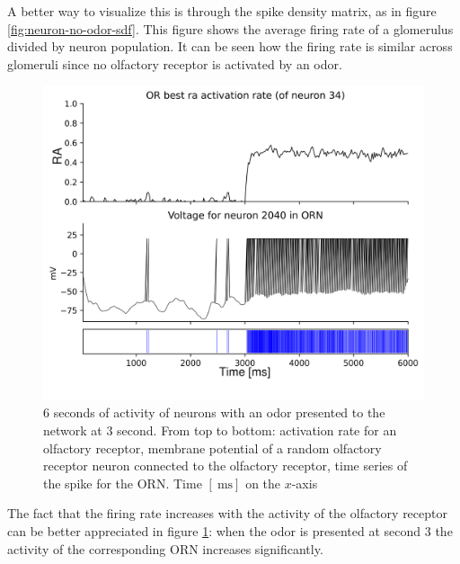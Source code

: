   A better way to visualize this is through the spike density matrix, as in figure \ref{fig:neuron-no-odor-sdf}.
  This figure shows the average firing rate of a glomerulus divided by neuron population.
  It can be seen how the firing rate is similar across glomeruli since no olfactory receptor is activated by an odor.

  \begin{figure}
    \centering
    \includegraphics[width=\textwidth]{neuron-odor}
    \caption{$6$ seconds of activity of neurons with an odor presented to the network at $3$ second. From top to bottom: activation rate for an olfactory receptor, membrane potential of a random olfactory receptor neuron connected to the olfactory receptor, time series of the spike for the ORN. Time $[\SI{}{\milli\second}]$ on the $x$-axis}
    \label{fig:neuron-odor}
  \end{figure}

  The fact that the firing rate increases with the activity of the olfactory receptor can be better appreciated in figure \ref{fig:neuron-odor}: when the odor is presented at second $3$ the activity of the corresponding ORN increases significantly.

